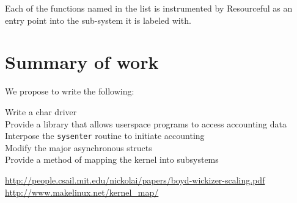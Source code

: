 \documentclass[12pt]{article}
\begin{document}
  Each of the functions named in the list is instrumented by Resourceful as an entry point into the sub-system it is labeled with.

  \section{Summary of work}

  We propose to write the following:
  \begin{description}
  \item[Write a char driver]
  \item[Provide a library that allows userspace programs to access accounting data]
  \item[Interpose the \texttt{sysenter} routine to initiate accounting]
  \item[Modify the major asynchronous structs]
  \item[Provide a method of mapping the kernel into subsystems]
  \end{description}


  \begin{thebibliography}{1}

   \url{http://people.csail.mit.edu/nickolai/papers/boyd-wickizer-scaling.pdf}
   \url{http://www.makelinux.net/kernel_map/}

  \end{thebibliography}
\end{document}
